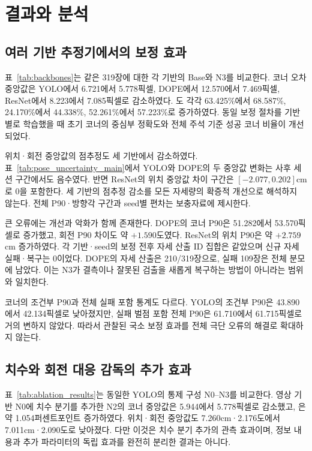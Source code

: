 \section{결과와 분석}\label{sec:results}
\subsection{여러 기반 추정기에서의 보정 효과}
표~\ref{tab:backbones}는 같은 319장에 대한 각 기반의 Base와 N3를 비교한다. 코너 오차 중앙값은 YOLO에서 6.721에서 5.778픽셀, DOPE에서 12.570에서 7.469픽셀, ResNet에서 8.223에서 7.085픽셀로 감소하였다. \pckten 도 각각 63.425\%에서 68.587\%, 24.170\%에서 44.338\%, 52.261\%에서 57.223\%로 증가하였다. 동일 보정 절차를 기반별로 학습했을 때 초기 코너의 중심부 정확도와 전체 주석 기준 성공 코너 비율이 개선되었다.

위치·회전 중앙값의 점추정도 세 기반에서 감소하였다. 표~\ref{tab:pose_uncertainty_main}에서 YOLO와 DOPE의 두 중앙값 변화는 사후 세션 구간에서도 음수였다. 반면 ResNet의 위치 중앙값 차이 구간은 $[-2.077,0.202]$cm로 0을 포함한다. 세 기반의 점추정 감소를 모든 자세량의 확증적 개선으로 해석하지 않는다. 전체 P90·방향각 구간과 seed별 편차는 보충자료에 제시한다.



큰 오류에는 개선과 악화가 함께 존재한다. DOPE의 코너 P90은 51.282에서 53.570픽셀로 증가했고, 회전 P90 차이도 약 $+1.590$도였다. ResNet의 위치 P90은 약 $+2.759$cm 증가하였다. 각 기반·seed의 보정 전후 자세 산출 ID 집합은 같았으며 신규 자세 실패·복구는 0이었다. DOPE의 자세 산출은 210/319장으로, 실패 109장은 전체 분모에 남았다. 이는 N3가 결측이나 잘못된 검출을 새롭게 복구하는 방법이 아니라는 범위와 일치한다.

코너의 조건부 P90과 전체 실패 포함 통계도 다르다. YOLO의 조건부 P90은 43.890에서 42.134픽셀로 낮아졌지만, 실패 벌점 포함 전체 P90은 61.710에서 61.715픽셀로 거의 변하지 않았다. 따라서 관찰된 국소 보정 효과를 전체 극단 오류의 해결로 확대하지 않는다.

\subsection{치수와 회전 대응 감독의 추가 효과}
표~\ref{tab:ablation_results}는 동일한 YOLO의 통제 구성 N0--N3를 비교한다. 영상 기반 N0에 치수 분기를 추가한 N2의 코너 중앙값은 5.944에서 5.778픽셀로 감소했고, \pckten 은 약 1.054퍼센트포인트 증가하였다. 위치·회전 중앙값도 7.260cm·2.176도에서 7.011cm·2.090도로 낮아졌다. 다만 이것은 치수 분기 추가의 관측 효과이며, 정보 내용과 추가 파라미터의 독립 효과를 완전히 분리한 결과는 아니다.


